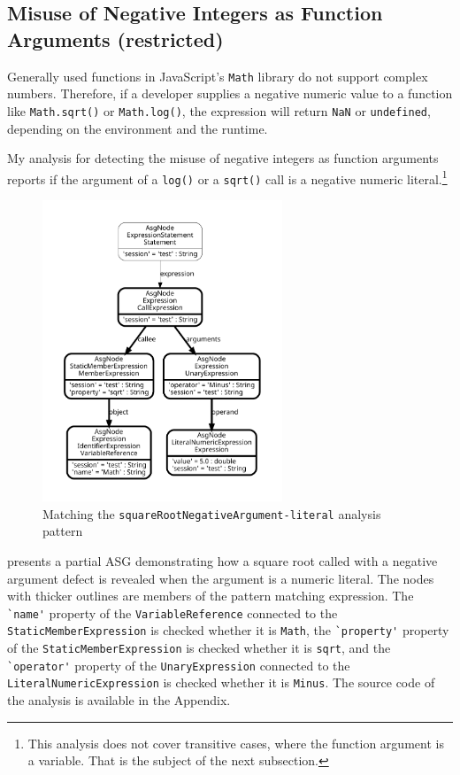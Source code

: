 \subsection{Misuse of Negative Integers as Function Arguments (restricted)}

Generally used functions in JavaScript's \lstinline{Math} library do not support complex numbers. Therefore, if a developer supplies a negative numeric value to a function like \lstinline{Math.sqrt()} or \lstinline{Math.log()}, the expression will return \lstinline{NaN} or \lstinline{undefined}, depending on the environment and the runtime.

My analysis for detecting the misuse of negative integers as function arguments reports if the argument of a \lstinline{log()} or a \lstinline{sqrt()} call is a negative numeric literal.\footnote{This analysis does not cover transitive cases, where the function argument is a variable. That is the subject of the next subsection.}

\begin{figure}[!htb]
	\centering
	\includegraphics[height=90mm, trim=12mm 12mm 12mm 12mm,clip]{figures/analysis_squareRootArgument.pdf}
	\caption{Matching the \lstinline{squareRootNegativeArgument-literal} analysis pattern}
	\label{fig:analysis-squarerootnegativeargument-simple}
\end{figure}

 presents a partial ASG demonstrating how a square root called with a negative argument defect is revealed when the argument is a numeric literal. The nodes with thicker outlines are members of the pattern matching expression. The \lstinline{`name'} property of the \lstinline{VariableReference} connected to the \lstinline{StaticMemberExpression} is checked whether it is \lstinline{Math}, the \lstinline{`property'} property of the \lstinline{StaticMemberExpression} is checked whether it is \lstinline{sqrt}, and the \lstinline[keywordstyle={}]{`operator'} property of the \lstinline{UnaryExpression} connected to the \lstinline{LiteralNumericExpression} is checked whether it is \lstinline{Minus}. The source code of the analysis is available in the Appendix.


